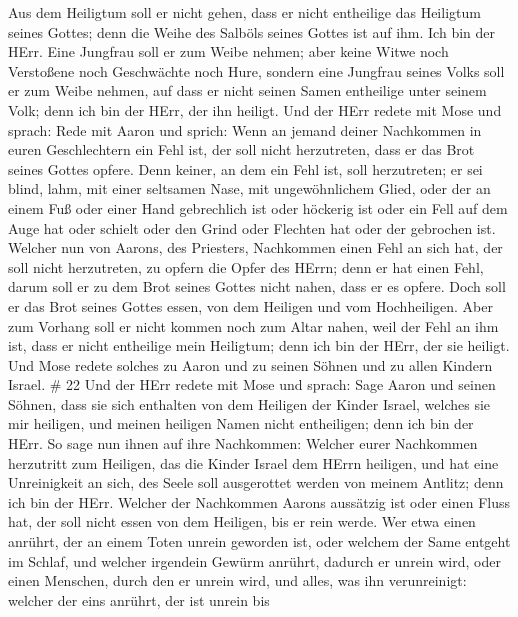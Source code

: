  Aus dem Heiligtum soll er nicht gehen, dass er nicht
entheilige das Heiligtum seines Gottes; denn die Weihe des Salböls
seines Gottes ist auf ihm. Ich bin der HErr.  Eine Jungfrau
soll er zum Weibe nehmen;  aber keine Witwe noch Verstoßene
noch Geschwächte noch Hure, sondern eine Jungfrau seines Volks soll er
zum Weibe nehmen,  auf dass er nicht seinen Samen
entheilige unter seinem Volk; denn ich bin der HErr, der ihn heiligt.
 Und der HErr redete mit Mose und sprach: 
Rede mit Aaron und sprich: Wenn an jemand deiner Nachkommen in euren
Geschlechtern ein Fehl ist, der soll nicht herzutreten, dass er das Brot
seines Gottes opfere.  Denn keiner, an dem ein Fehl ist,
soll herzutreten; er sei blind, lahm, mit einer seltsamen Nase, mit
ungewöhnlichem Glied,  oder der an einem Fuß oder einer
Hand gebrechlich ist  oder höckerig ist oder ein Fell auf
dem Auge hat oder schielt oder den Grind oder Flechten hat oder der
gebrochen ist.  Welcher nun von Aarons, des Priesters,
Nachkommen einen Fehl an sich hat, der soll nicht herzutreten, zu opfern
die Opfer des HErrn; denn er hat einen Fehl, darum soll er zu dem Brot
seines Gottes nicht nahen, dass er es opfere.  Doch soll er
das Brot seines Gottes essen, von dem Heiligen und vom Hochheiligen.
 Aber zum Vorhang soll er nicht kommen noch zum Altar
nahen, weil der Fehl an ihm ist, dass er nicht entheilige mein
Heiligtum; denn ich bin der HErr, der sie heiligt.  Und
Mose redete solches zu Aaron und zu seinen Söhnen und zu allen Kindern
Israel. \# 22  Und der HErr redete mit Mose und sprach:
 Sage Aaron und seinen Söhnen, dass sie sich enthalten von
dem Heiligen der Kinder Israel, welches sie mir heiligen, und meinen
heiligen Namen nicht entheiligen; denn ich bin der HErr.  So
sage nun ihnen auf ihre Nachkommen: Welcher eurer Nachkommen herzutritt
zum Heiligen, das die Kinder Israel dem HErrn heiligen, und hat eine
Unreinigkeit an sich, des Seele soll ausgerottet werden von meinem
Antlitz; denn ich bin der HErr.  Welcher der Nachkommen
Aarons aussätzig ist oder einen Fluss hat, der soll nicht essen von dem
Heiligen, bis er rein werde. Wer etwa einen anrührt, der an einem Toten
unrein geworden ist, oder welchem der Same entgeht im Schlaf,
 und welcher irgendein Gewürm anrührt, dadurch er unrein
wird, oder einen Menschen, durch den er unrein wird, und alles, was ihn
verunreinigt:  welcher der eins anrührt, der ist unrein bis
